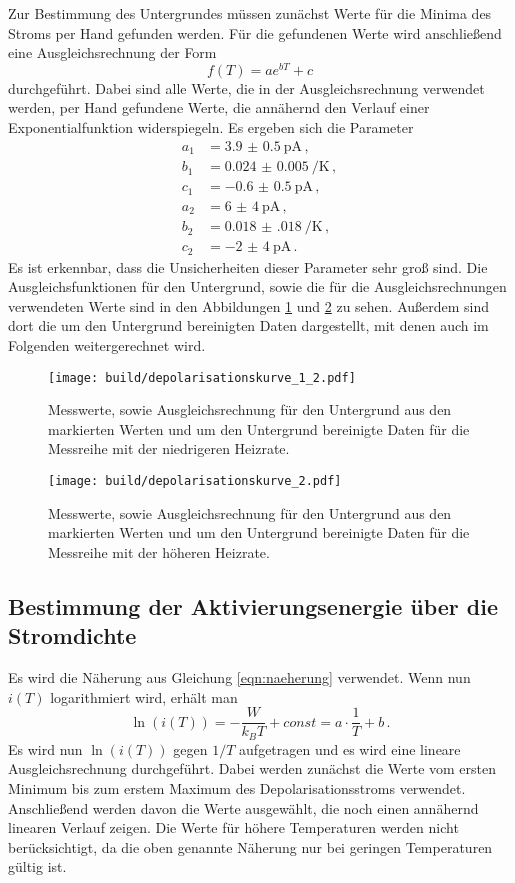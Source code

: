 Zur Bestimmung des Untergrundes müssen zunächst Werte für die Minima des Stroms per Hand gefunden
werden. Für die gefundenen Werte wird anschließend eine Ausgleichsrechnung der
Form
\begin{equation*}
  f(T)=a e^{bT} +c
\end{equation*}
durchgeführt. Dabei sind alle Werte, die in der Ausgleichsrechnung verwendet werden,
per Hand gefundene Werte, die annähernd den Verlauf einer Exponentialfunktion
widerspiegeln. Es ergeben sich die Parameter
\begin{align*}
  a_1&=\SI{3.9(05)}{\pico\ampere}  \,,\\
  b_1&=\SI{0.024(0005)}{\per\kelvin}  \,,\\
  c_1&=\SI{-0.6(05)}{\pico\ampere}  \,,\\
  a_2&=\SI{6(4)}{\pico\ampere}  \,,\\
  b_2&=\SI{0.018(018)}{\per\kelvin}  \,,\\
  c_2&=\SI{-2(4)}{\pico\ampere}  \,.
\end{align*}
Es ist erkennbar, dass die Unsicherheiten dieser Parameter sehr groß sind.
Die Ausgleichsfunktionen für den Untergrund, sowie die für die Ausgleichsrechnungen
verwendeten Werte sind in den Abbildungen \ref{fig:depol1} und \ref{fig:depol2} zu sehen.
Außerdem sind dort die um den Untergrund bereinigten Daten dargestellt, mit denen auch
im Folgenden weitergerechnet wird.

\begin{figure}
  \centering
  \texttt{[image: build/depolarisationskurve\_1\_2.pdf]}
  \caption{Messwerte, sowie Ausgleichsrechnung für den Untergrund aus den markierten Werten
  und um den Untergrund bereinigte Daten für die Messreihe mit der niedrigeren Heizrate.}
  \label{fig:depol1}
\end{figure}
\begin{figure}
  \centering
  \texttt{[image: build/depolarisationskurve\_2.pdf]}
  \caption{Messwerte, sowie Ausgleichsrechnung für den Untergrund aus den markierten Werten
  und um den Untergrund bereinigte Daten für die Messreihe mit der höheren Heizrate.}
  \label{fig:depol2}
\end{figure}

\subsection{Bestimmung der Aktivierungsenergie über die Stromdichte}

Es wird die Näherung aus Gleichung \eqref{eqn:naeherung} verwendet. Wenn nun $i(T)$
logarithmiert wird, erhält man
\begin{equation*}
  \ln(i(T))=-\frac{W}{k_B T} + const =a\cdot \frac{1}{T} +b  \,.
\end{equation*}
Es wird nun $\ln(i(T))$ gegen $1/T$ aufgetragen und es wird eine lineare Ausgleichsrechnung
durchgeführt. Dabei werden zunächst die Werte vom ersten Minimum bis zum erstem Maximum
des Depolarisationsstroms verwendet. Anschließend werden davon die Werte ausgewählt, die
noch einen annähernd linearen Verlauf zeigen. Die Werte für höhere Temperaturen werden
nicht berücksichtigt, da die oben genannte Näherung nur bei geringen
Temperaturen gültig ist.

